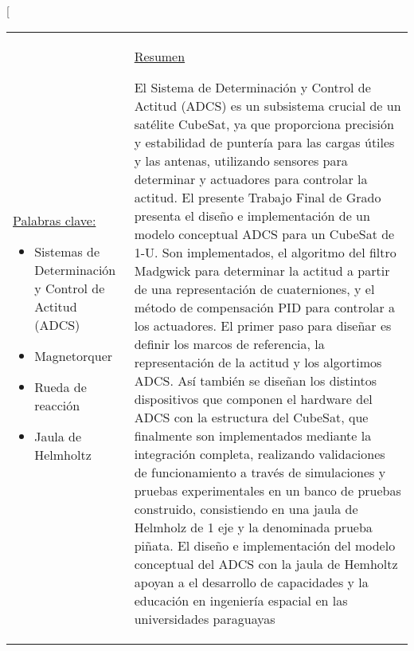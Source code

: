 \twocolumn[
	\begin{@twocolumnfalse}
		\maketitle
		\centering
		\begin{tabular}{p{6cm} p{10.3cm}} %
			\\ \hline

			\vspace{-0.1cm}
			\uline{Palabras clave:\hfill}
			\begin{itemize}
				\setlength\itemsep{-0.2em}
				\item Sistemas de Determinación y Control de Actitud (ADCS)
				\item Magnetorquer
				\item Rueda de reacción
				\item Jaula de Helmholtz
			\end{itemize}
			                                                        & \vspace{-0.1cm}
			\uline{Resumen\hfill}
			\thispagestyle{firststyle}

			El Sistema de Determinación y Control de Actitud (ADCS) es un subsistema
			crucial de un satélite CubeSat, ya que proporciona precisión y estabilidad de puntería para las
			cargas útiles y las antenas, utilizando sensores para determinar y actuadores para controlar la
			actitud. El presente Trabajo Final de Grado presenta el diseño e implementación de un modelo
			conceptual ADCS para un CubeSat de 1-U. Son implementados,  el algoritmo del filtro Madgwick para
			determinar la actitud a partir de una representación de cuaterniones, y el método de compensación
			PID para controlar a los actuadores. El primer paso para diseñar es definir los marcos de
			referencia, la representación de la actitud y los algortimos ADCS. Así también se diseñan los
			distintos dispositivos que componen el hardware del ADCS con la estructura del CubeSat, que
			finalmente son implementados mediante la integración completa, realizando validaciones de
			funcionamiento a través de simulaciones y pruebas experimentales en un banco de pruebas construido,
			consistiendo en una jaula de Helmholz de 1 eje y la denominada prueba piñata. El diseño e
			implementación del modelo conceptual del ADCS con la jaula de Hemholtz apoyan a el desarrollo de
			capacidades y la educación en ingeniería espacial en las universidades paraguayas


\end{tabular}
\end{@twocolumnfalse}
